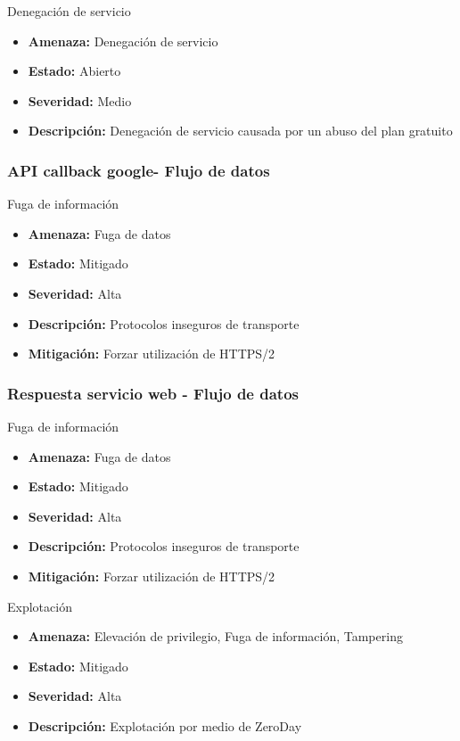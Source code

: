 Denegación de servicio
\begin{itemize}
    \item \textbf{Amenaza: } Denegación de servicio
    \item \textbf{Estado: } Abierto
    \item \textbf{Severidad: } Medio
    \item \textbf{Descripción: } Denegación de servicio causada por un abuso del plan gratuito
\end{itemize}


\subsubsection{API callback google- Flujo de datos}
Fuga de información
\begin{itemize}
    \item \textbf{Amenaza: } Fuga de datos
    \item \textbf{Estado: } Mitigado
    \item \textbf{Severidad: } Alta
    \item \textbf{Descripción: } Protocolos inseguros de transporte
    \item \textbf{Mitigación: } Forzar utilización de HTTPS/2
\end{itemize}

\subsubsection{Respuesta servicio web - Flujo de datos}
Fuga de información
\begin{itemize}
    \item \textbf{Amenaza: } Fuga de datos
    \item \textbf{Estado: } Mitigado
    \item \textbf{Severidad: } Alta
    \item \textbf{Descripción: } Protocolos inseguros de transporte
    \item \textbf{Mitigación: } Forzar utilización de HTTPS/2
\end{itemize}


Explotación
\begin{itemize}
    \item \textbf{Amenaza: } Elevación de privilegio, Fuga de información, Tampering
    \item \textbf{Estado: } Mitigado
    \item \textbf{Severidad: } Alta
    \item \textbf{Descripción: } Explotación por medio de ZeroDay
\end{itemize}


